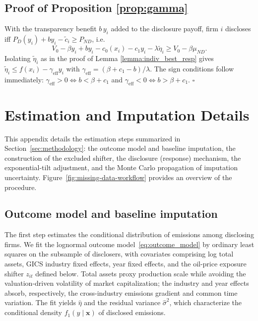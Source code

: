 \documentclass[a4paper,12pt]{article}
\begin{document}
\subsection{Proof of Proposition \ref{prop:gamma}}

With the transparency benefit $b\, y_i$ added to the disclosure payoff, firm $i$ discloses iff $P_D(y_i) + b y_i - \tilde{c}_i \geq P_{ND}$, i.e.
\begin{equation*}
    V_0 - \beta y_i + b y_i - c_0(x_i) - c_1 y_i - \lambda \tilde{\eta}_i \geq V_0 - \beta \mu_{ND}.
\end{equation*}
Isolating $\tilde{\eta}_i$ as in the proof of Lemma \ref{lemma:indiv_best_resp} gives $\tilde{\eta}_i \leq f(x_i) - \gamma_{\mathrm{eff}} y_i$ with $\gamma_{\mathrm{eff}} = (\beta + c_1 - b)/\lambda$. The sign conditions follow immediately: $\gamma_{\mathrm{eff}} > 0 \iff b < \beta + c_1$ and $\gamma_{\mathrm{eff}} < 0 \iff b > \beta + c_1$. \hfill $\square$

\section{Estimation and Imputation Details}
\label{app:methods}

This appendix details the estimation steps summarized in Section~\ref{sec:methodology}: the outcome model and baseline imputation, the construction of the excluded shifter, the disclosure (response) mechanism, the exponential-tilt adjustment, and the Monte Carlo propagation of imputation uncertainty. Figure~\ref{fig:missing-data-workflow} provides an overview of the procedure.

\subsection{Outcome model and baseline imputation}

The first step estimates the conditional distribution of emissions among disclosing firms. We fit the lognormal outcome model~\eqref{eq:outcome_model} by ordinary least squares on the subsample of disclosers, with covariates comprising log total assets, GICS industry fixed effects, year fixed effects, and the oil-price exposure shifter $z_{it}$ defined below. Total assets proxy production scale while avoiding the valuation-driven volatility of market capitalization; the industry and year effects absorb, respectively, the cross-industry emissions gradient and common time variation. The fit yields $\hat\eta$ and the residual variance $\hat\sigma^2$, which characterize the conditional density $f_1(y \mid \mathbf{x})$ of disclosed emissions.
\end{document}
